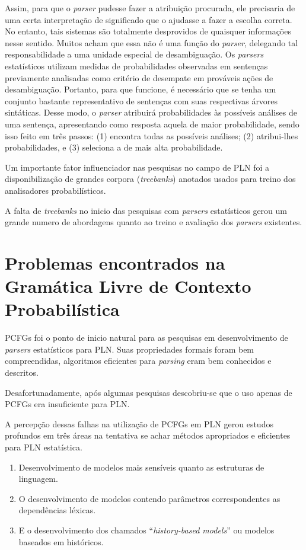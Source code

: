 Assim, para que o \emph{parser} pudesse fazer a atribuição procurada, ele precisaria de uma certa interpretação de significado que o ajudasse a fazer a escolha correta. No entanto, tais sistemas são totalmente desprovidos de quaisquer informações nesse sentido. Muitos acham que essa não é uma função do \emph{parser}, delegando tal responsabilidade a uma unidade especial de desambiguação.
Os \emph{parsers} estatísticos utilizam medidas de probabilidades observadas em sentenças previamente analisadas como critério de desempate em prováveis ações de desambiguação. Portanto, para que funcione, é necessário que se tenha um conjunto bastante representativo de sentenças com suas respectivas árvores sintáticas. Desse modo, o \emph{parser} atribuirá probabilidades às possíveis análises de uma sentença, apresentando como resposta aquela de maior probabilidade, sendo isso feito em três passos: (1) encontra todas as possíveis análises; (2) atribui-lhes probabilidades, e (3) seleciona a de mais alta probabilidade.


Um importante fator influenciador nas pesquisas no campo de PLN foi a disponibilização de grandes corpora (\emph{treebanks}) anotados usados para treino dos analisadores probabilísticos.

A falta de \emph{treebanks} no inicio das pesquisas com \emph{parsers} estatísticos gerou um grande numero de abordagens quanto ao treino e avaliação dos \emph{parsers} existentes.



\section{Problemas encontrados  na Gramática Livre de Contexto Probabilística}
\label{sec:prob_encontrados}

PCFGs foi o ponto de inicio natural para as pesquisas em desenvolvimento de \emph{parsers} estatísticos para PLN. Suas propriedades formais foram bem compreendidas, algoritmos eficientes para \emph{parsing} eram bem conhecidos e descritos.

Desafortunadamente, após algumas  pesquisas descobriu-se que o uso apenas de PCFGs  era insuficiente para  PLN.

A percepção dessas falhas na utilização de PCFGs em PLN gerou estudos profundos em três áreas na tentativa se achar métodos apropriados e eficientes para PLN estatística.

\begin{enumerate}
  \item Desenvolvimento de modelos mais sensíveis quanto as estruturas de linguagem.
  \item O desenvolvimento de modelos contendo parâmetros correspondentes as dependências léxicas.
  \item E o desenvolvimento dos chamados ``\emph{history-based models}'' ou modelos baseados em históricos.
\end{enumerate}



